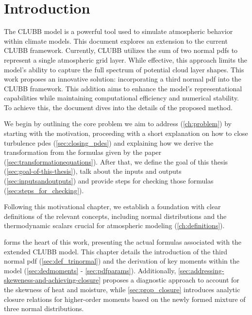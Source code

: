 \chapter{Introduction}\label{ch:introduction}

The \gls{CLUBB} model is a powerful tool used to simulate atmospheric behavior within climate models.
This document explores an extension to the current \gls{CLUBB} framework.
Currently, \gls{CLUBB} utilizes the sum of two normal \glspl{pdf}
to represent a single atmospheric grid layer.
While effective,
this approach limits the model's ability to capture the full spectrum of potential cloud layer shapes.
This work proposes an innovative solution:
incorporating a third normal \gls{pdf} into the \gls{CLUBB} framework.
This addition aims to enhance the model's representational capabilities
while maintaining computational efficiency and numerical stability.
To achieve this, the document dives into the details of the proposed method.

We begin by outlining the core problem we aim to address (\cref{ch:problem})
by starting with the motivation,
proceeding with a short explanation on how to close turbulence \glspl{pde} (\cref{sec:closing_pdes})
and explaining how we derive the transformation from the formulas
given by the paper~\cite{larson2005using} (\cref{sec:transformationequations}).
After that, we define the goal of this thesis (\cref{sec:goal-of-this-thesis}),
talk about the inputs and outputs (\cref{sec:inputsandoutputs})
and provide steps for checking those formulas (\cref{sec:steps_for_checking}).

Following this motivational chapter,
we establish a foundation with clear definitions of the relevant concepts,
including normal distributions and the thermodynamic scalars
crucial for atmospheric modeling (\cref{ch:definitions}).

 forms the heart of this work,
presenting the actual formulas associated with the extended \gls{CLUBB} model.
This chapter details the introduction of the third normal \gls{pdf} (\cref{sec:def_trinormal})
and the derivation of key moments within the model (\cref{sec:dedmoments} - \cref{sec:pdfparams}).
Additionally,
\cref{sec:addressing-skeweness-and-achieving-closure} proposes a diagnostic approach
to account for the skewness of heat and moisture,
while \cref{sec:prop_closure} introduces analytic closure relations
for higher-order moments based on the newly formed mixture of three normal distributions.

